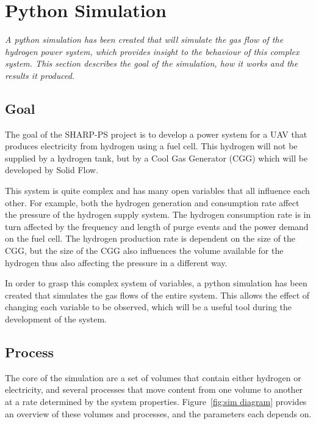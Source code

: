 \section{Python Simulation}%
\label{sec:simulation}
\emph{A python simulation has been created that will simulate the gas flow of the hydrogen power system, which provides insight to the behaviour of this complex system. This section describes the goal of the simulation, how it works and the results it produced.}

\subsection*{Goal}
The goal of the SHARP-PS project is to develop a power system for a UAV that produces electricity from hydrogen using a fuel cell. This hydrogen will not be supplied by a hydrogen tank, but by a Cool Gas Generator (CGG) which will be developed by Solid Flow.

This system is quite complex and has many open variables that all influence each other.
For example, both the hydrogen generation and consumption rate affect the pressure of the hydrogen supply system. The hydrogen consumption rate is in turn affected by the frequency and length of purge events and the power demand on the fuel cell. The hydrogen production rate is dependent on the size of the CGG, but the size of the CGG also influences the volume available for the hydrogen thus also affecting the pressure in a different way.

In order to grasp this complex system of variables, a python simulation has been created that simulates the gas flows of the entire system. This allows the effect of changing each variable to be observed, which will be a useful tool during the development of the system.

\subsection*{Process}
The core of the simulation are a set of volumes that contain either hydrogen or electricity, and several processes that move content from one volume to another at a rate determined by the system properties. Figure~\ref{fig:sim diagram} provides an overview of these volumes and processes, and the parameters each depends on.

\newcommand{\pytable}[2]{
    \begin{tabular}{c}
        \textbf{#1} \\
        \midrule
        #2          \\
    \end{tabular}
}

